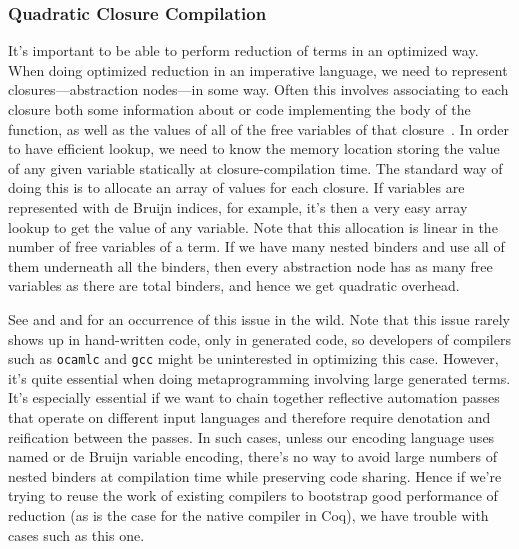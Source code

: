 \subsubsection{Quadratic Closure Compilation} \label{sec:perf:closure-compilation} \label{sec:perf:quadratic-vm-native}
It's important to be able to perform reduction of terms in an optimized way.
%
When doing optimized reduction in an imperative language, we need to represent closures---abstraction nodes---in some way.
Often this involves associating to each closure both some information about or code implementing the body of the function, as well as the values of all of the free variables of that closure~\cite{Efficient2000Shao}.
In order to have efficient lookup, we need to know the memory location storing the value of any given variable statically at closure-compilation time.
The standard way of doing this
%
is to allocate an array of values for each closure.
If variables are represented with de Bruijn indices, for example, it's then a very easy array lookup to get the value of any variable.
Note that this allocation is linear in the number of free variables of a term.
If we have many nested binders and use all of them underneath all the binders, then every abstraction node has as many free variables as there are total binders, and hence we get quadratic overhead.

See  and  and  for an occurrence of this issue in the wild.
Note that this issue rarely shows up in hand-written code, only in generated code, so developers of compilers such as \texttt{ocamlc} and \texttt{gcc} might be uninterested in optimizing this case.
However, it's quite essential when doing metaprogramming involving large generated terms.
It's especially essential if we want to chain together reflective automation passes that operate on different input languages and therefore require denotation and reification between the passes.
In such cases, unless our encoding language uses named or de Bruijn variable encoding, there's no way to avoid large numbers of nested binders at compilation time while preserving code sharing.
Hence if we're trying to reuse the work of existing compilers to bootstrap good performance of reduction (as is the case for the native compiler in Coq), we have trouble with cases such as this one.
%

